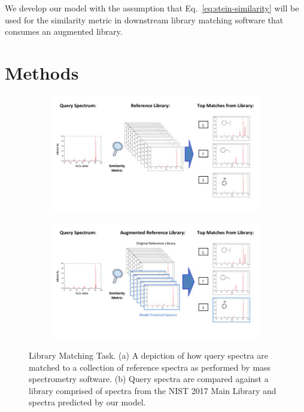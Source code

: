 \documentclass{article}
\begin{document}
We develop our model with the assumption that Eq.~\eqref{eq:stein-similarity} will be used for the similarity metric in downstream library matching software that consumes an augmented library.


\section{Methods}

\begin{figure}[h]
    \centering
    \begin{subfigure}{0.8\textwidth}
        \includegraphics[width=\textwidth, trim={1cm 2.3cm 1cm 0cm}]{./figures/baseline_reference_library.jpg}
        \caption{}
    \end{subfigure}
    \begin{subfigure}{0.8\textwidth}
        \includegraphics[width=\textwidth, trim={1cm 2.3cm 1cm 0cm}]{./figures/Library_matching.jpg}
        \caption{}
    \end{subfigure}
    \caption{Library Matching Task. (a) A depiction of how query spectra are matched to a collection of reference spectra as performed by mass spectrometry software. (b) Query spectra are compared against a library comprised of spectra from the NIST 2017 Main Library and spectra predicted by our model.}
    \label{fig:library_matching}
\end{figure}
\end{document}
